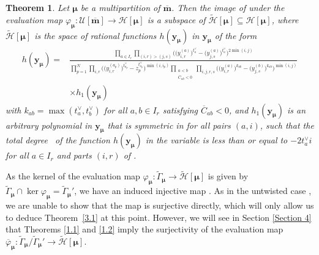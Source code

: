 \documentclass[10pt,a4paper]{amsart}
\numberwithin{equation}{section}
\newtheorem{Theorem}{Theorem}[section]
\begin{document}
\begin{Theorem}\label{3.9}
Let $\bm{\mu}$ be a multipartition of $\overline{\mathbf{m}}$. Then the image \smash{$\varphi_{\bm{\mu}}\bigl(\tilde{\Gamma}_{\bm{\mu}}\bigr)$} of \smash{$\tilde{\Gamma}_{\bm{\mu}}$} under the evaluation map $\varphi_{\bm{\mu}}\colon\mathcal{U}[\overline{\mathbf{m}}]\to \mathcal{H}[\bm{\mu}]$ is a subspace of $\tilde{\mathcal{H}}[\bm{\mu}]\subseteq\mathcal{H}[\bm{\mu}]$, where $\tilde{ \mathcal{H}}[\bm{\mu}]$ is the space of rational functions
$h(\mathbf{y}_{\bm{\mu}})$ in $\mathbf{y}_{\bm{\mu}}$ of the form
\begin{align}
h(\mathbf{y}_{\bm{\mu}})
={}&\frac{\prod_{a\in I_r}\prod_{(i,r)>(j,s)}\bigl(\bigl(y_{i,r}^{(a)}\bigr)^{t_a^{\vee}}-\bigl(y_{j,s}^{(a)}\bigr) ^{t_a^{\vee}}\bigr)^{2\min(i,j)}}{\prod_{p=1}^N \prod_{i,r}\bigl(\bigl(y_{i,r}^{(a_p)}\bigr)^{t_{a_p}^{\vee}}-z_p^{t_{a_p} ^{\vee}})^{\min(i,i_p)}\prod_{\substack{a<b\\ \overline{C}_{ab}<0}}\prod_{i, j,r,s}\bigl(\bigl(y_{i,r}^{(a)}\bigr)^{k_{ab}}-\bigl(y_{j,s}^{(b)}\bigr) ^{k_{ab}}\bigr)^{\min(i,j)}}\nonumber\\
&\times h_1(\mathbf{y}_{\bm{\mu}})\label{eq:3.45}
\end{align}
with $k_{ab}=\max(t_a^{\vee},t_b^{\vee})$ for all $a,b\in I_r$ satisfying $\overline{C}_{ab}<0$, and $h_1(\mathbf{y}_{\bm{ \mu}})$ is an arbitrary polynomial in $\mathbf{y}_{\bm{\mu}}$ that is symmetric in  for all pairs $(a,i)$, such that the total degree~ of the function $h(\mathbf{y}_{\bm{ \mu}})$ in the variable  is less than or equal to $-2t_a^{\vee}i$ for all $a\in I_r$ and parts $(i,r)$ of .
\end{Theorem}

As the kernel of the evaluation map $\varphi_{\bm{\mu}} \colon\tilde{\Gamma}_{\bm{\mu}}\to\tilde{\mathcal{H}}[\bm{\mu}]$ is given by $\tilde{\Gamma}_{\bm{\mu}}\cap\ker\varphi_{\bm{\mu}} =\tilde{\Gamma}_{\bm{\mu}}'$, we have an induced injective map . As in the untwisted case \cite{AK07,AKS06}, we are unable to show that the map  is surjective directly, which will only allow us to deduce Theorem~\ref{3.1} at this point. However, we will see in Section \ref{Section 4} that Theorems \ref{1.1} and \ref{1.2} imply the surjectivity of the evaluation map $\overline{\varphi}_{ \bm{\mu}}\colon\tilde{\Gamma}_{\bm{\mu}}/\tilde{\Gamma}_{\bm{\mu}}' \to\tilde{\mathcal{H}}[\bm{\mu}]$.
\end{document}
